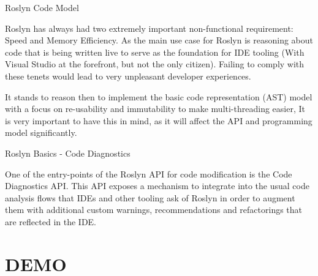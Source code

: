 \documentclass[10pt]{beamer}
\begin{document}
\begin{frame}{Roslyn Code Model}

Roslyn has always had two extremely important non-functional requirement: Speed and Memory Efficiency. As the main use case for Roslyn is reasoning about code that is being written live to serve as the foundation for IDE tooling (With Visual Studio at the forefront, but not the only citizen). Failing to comply with these tenets would lead to very unpleasant developer experiences.

It stands to reason then to implement the basic code representation (AST) model with a focus on re-usability and immutability to make multi-threading easier, It is very important to have this in mind, as it will affect the API and programming model significantly.
\end{frame}

\begin{frame}{Roslyn Basics - Code Diagnostics}

One of the entry-points of the Roslyn API for code modification is the Code Diagnostics API. This API exposes a mechanism to integrate into the usual code analysis flows that IDEs and other tooling ask of Roslyn in order to augment them with additional custom warnings, recommendations and refactorings that are reflected in the IDE.
\end{frame}

\section{DEMO}
\end{document}
